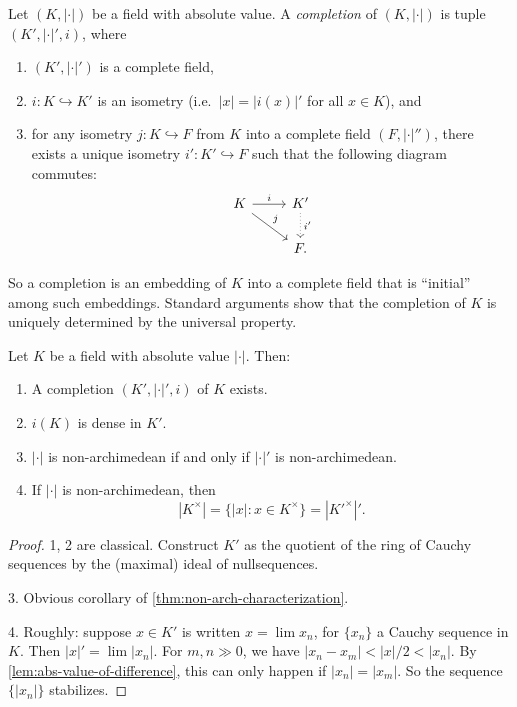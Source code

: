 \begin{definition}
Let $(K,|\cdot|)$ be a field with absolute value. A \emph{completion} of 
$(K,|\cdot|)$ is tuple $(K',|\cdot|',i)$, where 
\begin{enumerate}
\item $(K',|\cdot|')$ is a complete field, 
\item $i\colon K\hookrightarrow K'$ is an isometry 
(i.e.~$|x|=|i(x)|'$ for all $x\in K$), and 
\item for any isometry $j\colon K\hookrightarrow F$ from $K$ into a complete field 
$(F,|\cdot|'')$, there exists a unique isometry $i'\colon K'\hookrightarrow F$ 
such that the following diagram commutes:
\[
\begin{tikzcd}
  K \ar[r, "i"] \ar[dr, "j"]
    & K' \ar[d, "i'", dotted] \\
  & F .
\end{tikzcd}
\]
\end{enumerate}
\end{definition}

So a completion is an embedding of $K$ into a complete field that is 
``initial'' among such embeddings. Standard arguments show that the completion 
of $K$ is uniquely determined by the universal property. 

\begin{theorem}\label{thm:existence-completion}
Let $K$ be a field with absolute value $|\cdot|$. Then: 
\begin{enumerate}
\item A completion $(K',|\cdot|',i)$ of $K$ exists.  
\item $i(K)$ is dense in $K'$.
\item $|\cdot|$ is non-archimedean if and only if $|\cdot|'$ is non-archimedean.  
\item If $|\cdot|$ is non-archimedean, then 
\[
  |K^\times| = \{|x|\colon x\in K^\times\} = |{K'}^\times|' .
\]
\end{enumerate}
\end{theorem}
\begin{proof}
1, 2 are classical. Construct $K'$ as the quotient of the ring of Cauchy 
sequences by the (maximal) ideal of nullsequences. 

3. Obvious corollary of \autoref{thm:non-arch-characterization}. 

4. Roughly: suppose $x\in K'$ is written $x=\lim x_n$, for $\{x_n\}$ a Cauchy 
sequence in $K$. Then $|x|'=\lim |x_n|$. For $m,n\gg 0$, we have 
$|x_n-x_m|<|x|/2<|x_n|$. By \autoref{lem:abs-value-of-difference}, this can 
only happen if $|x_n|=|x_m|$. So the sequence $\{|x_n|\}$ stabilizes. 
\end{proof}

